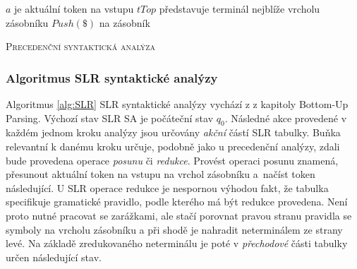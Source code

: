 \begin{algorithm}[H]
  \DontPrintSemicolon
  \SetAlgoNoLine
  \SetAlgoNoEnd

  \SetSideCommentLeft
  \LinesNumberedHidden

  \BlankLine

  \SetNlSty{}{}{:}
  \SetNlSkip{-1.1em}

  \Indp\Indpp


  $a$ je aktuální token na vstupu\;
  $tTop$ představuje terminál nejblíže vrcholu zásobníku\;
  \;
  \setcounter{AlgoLine}{0}
  \ShowLn $Push(\$)$ na zásobník\;
  \ShowLn {}
  \caption{\textsc{Precedenční syntaktická analýza}} \label{alg:Precedencni}
\end{algorithm}


\subsubsection*{Algoritmus SLR syntaktické analýzy}

Algoritmus \ref{alg:SLR} SLR syntaktické analýzy vychází z \cite{VYPa:2022} z kapitoly Bottom-Up Parsing.
Výchozí stav SLR SA je počáteční stav $q_0$. Následné akce provedené v každém jednom kroku analýzy jsou určovány
\emph{akční} částí SLR tabulky. Buňka relevantní k danému  kroku určuje, podobně jako u precedenční analýzy, zdali bude provedena operace
\emph{posunu} či \emph{redukce}. Provést operaci posunu znamená, přesunout aktuální token na vstupu na vrchol zásobníku a~načíst token
následující. U SLR operace redukce je nespornou výhodou fakt, že tabulka specifikuje gramatické pravidlo, podle kterého má být redukce
provedena. Není proto nutné pracovat se zarážkami, ale stačí porovnat pravou stranu pravidla se symboly na vrcholu zásobníku a při shodě
je nahradit neterminálem ze strany levé. Na základě zredukovaného neterminálu je poté v \emph{přechodové} části tabulky určen následující stav.

